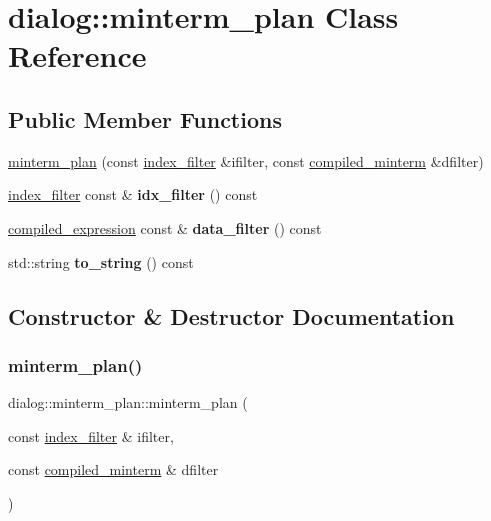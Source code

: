 \hypertarget{classdialog_1_1minterm__plan}{}\section{dialog\+:\+:minterm\+\_\+plan Class Reference}
\label{classdialog_1_1minterm__plan}
\subsection*{Public Member Functions}
\begin{DoxyCompactItemize}
\item 
\hyperlink{classdialog_1_1minterm__plan_a547b1de0f11a8ac86b78d5f4ce705e40}{minterm\+\_\+plan} (const \hyperlink{classdialog_1_1index__filter}{index\+\_\+filter} \&ifilter, const \hyperlink{structdialog_1_1compiled__minterm}{compiled\+\_\+minterm} \&dfilter)
\item 
\mbox{\label{classdialog_1_1minterm__plan_a13c39f09e13a13780fa3fad2705166c9}} 
\hyperlink{classdialog_1_1index__filter}{index\+\_\+filter} const  \& {\bfseries idx\+\_\+filter} () const
\item 
\mbox{\label{classdialog_1_1minterm__plan_a2d069c2597da15711483acfe8a0b9cfc}} 
\hyperlink{structdialog_1_1compiled__expression}{compiled\+\_\+expression} const  \& {\bfseries data\+\_\+filter} () const
\item 
\mbox{\label{classdialog_1_1minterm__plan_a2ea3335284edcf3db9727b1acb8ec108}} 
std\+::string {\bfseries to\+\_\+string} () const
\end{DoxyCompactItemize}


\subsection{Constructor \& Destructor Documentation}
\mbox{\label{classdialog_1_1minterm__plan_a547b1de0f11a8ac86b78d5f4ce705e40}} 
\subsubsection{\texorpdfstring{minterm\+\_\+plan()}{minterm\_plan()}}
{\footnotesize\ttfamily dialog\+::minterm\+\_\+plan\+::minterm\+\_\+plan (\begin{DoxyParamCaption}\item[{const \hyperlink{classdialog_1_1index__filter}{index\+\_\+filter} \&}]{ifilter,  }\item[{const \hyperlink{structdialog_1_1compiled__minterm}{compiled\+\_\+minterm} \&}]{dfilter }\end{DoxyParamCaption})\hspace{0.3cm}{\ttfamily [inline]}}

